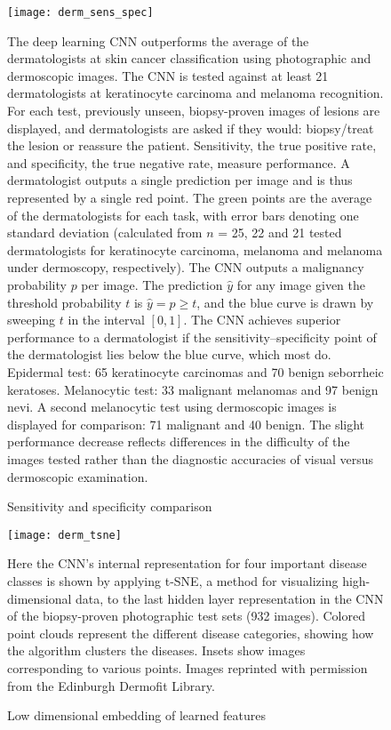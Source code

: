 \begin{figure}
\texttt{[image: derm\_sens\_spec]}
\caption{Sensitivity and specificity comparison}
\vspace{12px}
The deep learning CNN outperforms the average of the dermatologists at skin cancer classification using photographic and dermoscopic images. The CNN is tested against at least 21 dermatologists at keratinocyte carcinoma and melanoma recognition. For each test, previously unseen, biopsy-proven images of lesions are displayed, and dermatologists are asked if they would: biopsy/treat the lesion or reassure the patient. Sensitivity, the true positive rate, and specificity, the true negative rate, measure performance. A dermatologist outputs a single prediction per image and is thus represented by a single red point. The green points are the average of the dermatologists for each task, with error bars denoting one standard deviation (calculated from $n$ = 25, 22 and 21 tested dermatologists for keratinocyte carcinoma, melanoma and melanoma under dermoscopy, respectively). The CNN outputs a malignancy probability $p$ per image. The prediction $\hat{y}$ for any image given the threshold probability $t$ is $\hat{y} = p \geq t$, and the blue curve is drawn by sweeping $t$ in the interval $[0, 1]$. The CNN achieves superior performance to a dermatologist if the sensitivity–specificity point of the dermatologist lies below the blue curve, which most do. Epidermal test: 65 keratinocyte carcinomas and 70 benign seborrheic keratoses. Melanocytic test: 33 malignant melanomas and 97 benign nevi. A second melanocytic test using dermoscopic images is displayed for comparison: 71 malignant and 40 benign. The slight performance decrease reflects differences in the difficulty of the images tested rather than the diagnostic accuracies of visual versus dermoscopic examination.
\label{fig:derm_sens_spec}
\end{figure}

\begin{figure}
\texttt{[image: derm\_tsne]}
\caption{Low dimensional embedding of learned features}
\vspace{12px}
Here the CNN’s internal representation for four important disease classes is shown by applying t-SNE, a method for visualizing high-dimensional data, to the last hidden layer representation in the CNN of the biopsy-proven photographic test sets (932 images). Colored point clouds represent the different disease categories, showing how the algorithm clusters the diseases. Insets show images corresponding to various points. Images reprinted with permission from the Edinburgh Dermofit Library.
\label{fig:derm_tsne}
\end{figure}

